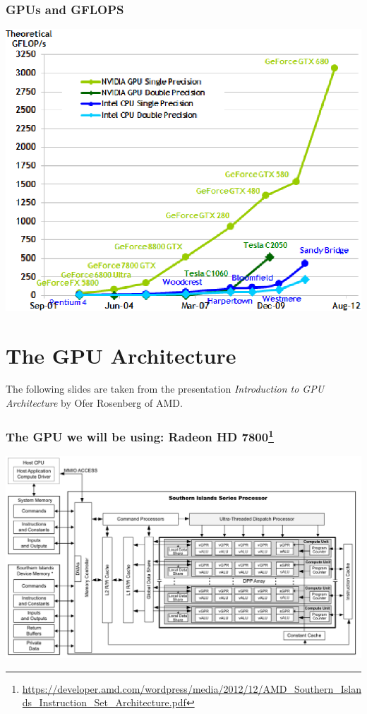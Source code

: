 \documentclass{beamer}
\begin{document}
\begin{frame}[fragile,t]
\frametitle{GPUs and GFLOPS}

\begin{center}
\includegraphics[height=43ex]{img/gpugflops.png}
\end  {center}

\end{frame}


\section{The GPU Architecture}

\begin{frame}
	\tableofcontents[currentsection]
\end{frame}

\begin{frame}
  The following slides are taken from the presentation
  \textit{Introduction to GPU Architecture} by Ofer Rosenberg of AMD.
\end{frame}

{

}

\begin{frame}
  \frametitle{The GPU we will be using: Radeon HD
    7800\footnote{\url{https://developer.amd.com/wordpress/media/2012/12/AMD_Southern_Islands_Instruction_Set_Architecture.pdf}}}

  \includegraphics[width=\textwidth]{img/pitcairn.png}
\end{frame}
\end{document}
